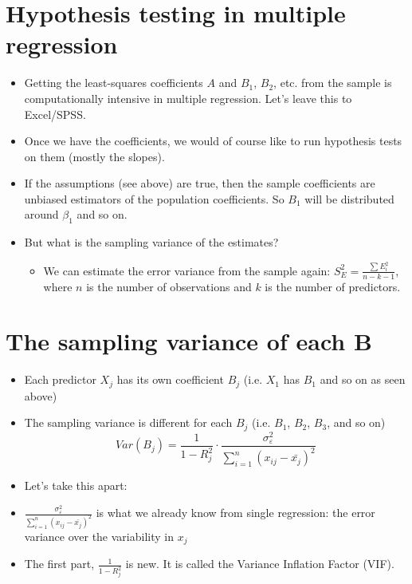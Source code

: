 \documentclass[]{article}
\providecommand{\tightlist}{%
  \setlength{\itemsep}{0pt}\setlength{\parskip}{0pt}}
\begin{document}
\section{Hypothesis testing in multiple
regression}\label{hypothesis-testing-in-multiple-regression}

\begin{itemize}
\tightlist
\item
  Getting the least-squares coefficients \(A\) and \(B_1\), \(B_2\),
  etc. from the sample is computationally intensive in multiple
  regression. Let's leave this to Excel/SPSS.
\item
  Once we have the coefficients, we would of course like to run
  hypothesis tests on them (mostly the slopes).
\item
  If the assumptions (see above) are true, then the sample coefficients
  are unbiased estimators of the population coefficients. So \(B_1\)
  will be distributed around \(\beta_1\) and so on.
\item
  But what is the sampling variance of the estimates?

  \begin{itemize}
  \tightlist
  \item
    We can estimate the error variance from the sample again:
    \(S_E^2 = \frac{\sum E_i^2}{n-k-1}\), where \(n\) is the number of
    observations and \(k\) is the number of predictors.
  \end{itemize}
\end{itemize}

\section{The sampling variance of each
B}\label{the-sampling-variance-of-each-b}

\begin{itemize}
\tightlist
\item
  Each predictor \(X_j\) has its own coefficient \(B_j\) (i.e. \(X_1\)
  has \(B_1\) and so on as seen above)
\item
  The sampling variance is different for each \(B_j\) (i.e. \(B_1\),
  \(B_2\), \(B_3\), and so on)
  \[ Var(B_j) = \frac{1}{1-R_j^2} \cdot \frac{\sigma_\varepsilon^2}{\sum\limits_{i=1}^{n}(x_{ij}-\bar{x_j})^2}\]
\item
  Let's take this apart:
\item
  \(\frac{\sigma_\varepsilon^2}{\sum\limits_{i=1}^{n}(x_{ij}-\bar{x_j})^2}\)
  is what we already know from single regression: the error variance
  over the variability in \(x_j\)
\item
  The first part, \(\frac{1}{1-R_j^2}\) is new. It is called the
  Variance Inflation Factor (VIF).
\end{itemize}
\end{document}
